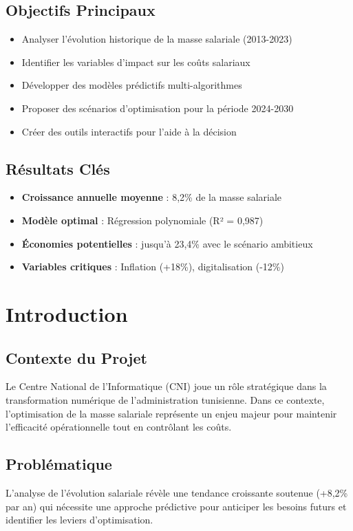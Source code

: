\documentclass[12pt,a4paper]{article}
\begin{document}
\subsection{Objectifs Principaux}
\begin{itemize}
    \item Analyser l'évolution historique de la masse salariale (2013-2023)
    \item Identifier les variables d'impact sur les coûts salariaux
    \item Développer des modèles prédictifs multi-algorithmes
    \item Proposer des scénarios d'optimisation pour la période 2024-2030
    \item Créer des outils interactifs pour l'aide à la décision
\end{itemize}

\subsection{Résultats Clés}
\begin{itemize}
    \item \textbf{Croissance annuelle moyenne} : 8,2\% de la masse salariale
    \item \textbf{Modèle optimal} : Régression polynomiale (R² = 0,987)
    \item \textbf{Économies potentielles} : jusqu'à 23,4\% avec le scénario ambitieux
    \item \textbf{Variables critiques} : Inflation (+18\%), digitalisation (-12\%)
\end{itemize}

\newpage

\section{Introduction}

\subsection{Contexte du Projet}
Le Centre National de l'Informatique (CNI) joue un rôle stratégique dans la transformation numérique de l'administration tunisienne. Dans ce contexte, l'optimisation de la masse salariale représente un enjeu majeur pour maintenir l'efficacité opérationnelle tout en contrôlant les coûts.

\subsection{Problématique}
L'analyse de l'évolution salariale révèle une tendance croissante soutenue (+8,2\% par an) qui nécessite une approche prédictive pour anticiper les besoins futurs et identifier les leviers d'optimisation.
\end{document}
